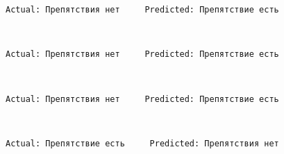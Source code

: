 \documentclass[11pt]{article}
\begin{document}
    \begin{Verbatim}[commandchars=\\\{\}]
Actual: Препятствия нет     Predicted: Препятствие есть

    \end{Verbatim}

    \begin{center}
    \end{center}
    { \hspace*{\fill} \\}
    
    \begin{Verbatim}[commandchars=\\\{\}]
Actual: Препятствия нет     Predicted: Препятствие есть

    \end{Verbatim}

    \begin{center}
    \end{center}
    { \hspace*{\fill} \\}
    
    \begin{Verbatim}[commandchars=\\\{\}]
Actual: Препятствия нет     Predicted: Препятствие есть

    \end{Verbatim}

    \begin{center}
    \end{center}
    { \hspace*{\fill} \\}
    
    \begin{Verbatim}[commandchars=\\\{\}]
Actual: Препятствие есть     Predicted: Препятствия нет

    \end{Verbatim}

    \begin{center}
    \end{center}
    { \hspace*{\fill} \\}
    
\end{document}

